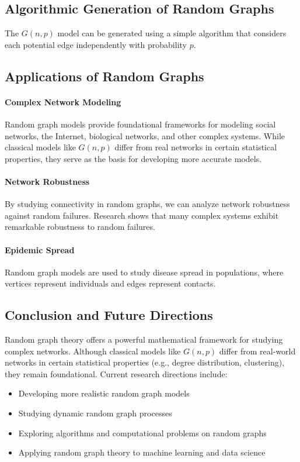 \subsection{Algorithmic Generation of Random Graphs}
The $G(n,p)$ model can be generated using a simple algorithm that considers each potential edge independently with probability $p$.

\subsection{Applications of Random Graphs}

\paragraph{Complex Network Modeling}
Random graph models provide foundational frameworks for modeling social networks, the Internet, biological networks, and other complex systems. While classical models like $G(n,p)$ differ from real networks in certain statistical properties, they serve as the basis for developing more accurate models.

\paragraph{Network Robustness}
By studying connectivity in random graphs, we can analyze network robustness against random failures. Research shows that many complex systems exhibit remarkable robustness to random failures.

\paragraph{Epidemic Spread}
Random graph models are used to study disease spread in populations, where vertices represent individuals and edges represent contacts.

\subsection{Conclusion and Future Directions}
Random graph theory offers a powerful mathematical framework for studying complex networks. Although classical models like $G(n,p)$ differ from real-world networks in certain statistical properties (e.g., degree distribution, clustering), they remain foundational. Current research directions include:
\begin{itemize}
\item Developing more realistic random graph models
\item Studying dynamic random graph processes
\item Exploring algorithms and computational problems on random graphs
\item Applying random graph theory to machine learning and data science
\end{itemize}